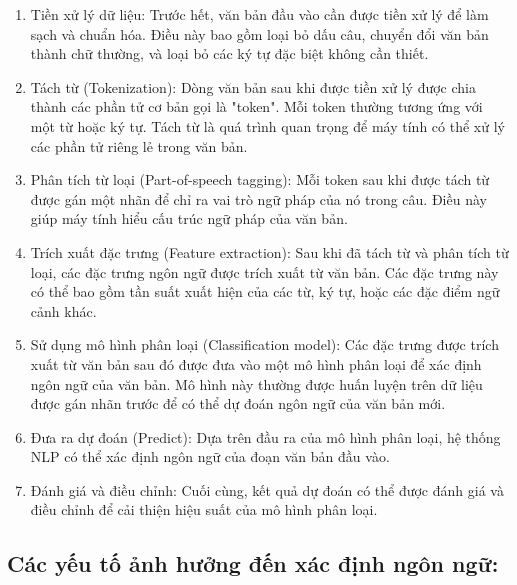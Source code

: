 \begin{enumerate}

    \item Tiền xử lý dữ liệu: Trước hết, văn bản đầu vào cần được tiền xử lý để làm sạch và chuẩn hóa. Điều này bao gồm loại bỏ dấu câu, chuyển đổi văn bản thành chữ thường, và loại bỏ các ký tự đặc biệt không cần thiết.
    \item Tách từ (Tokenization): Dòng văn bản sau khi được tiền xử lý được chia thành các phần tử cơ bản gọi là "token". Mỗi token thường tương ứng với một từ hoặc ký tự. Tách từ là quá trình quan trọng để máy tính có thể xử lý các phần tử riêng lẻ trong văn bản.
    \item Phân tích từ loại (Part-of-speech tagging): Mỗi token sau khi được tách từ được gán một nhãn để chỉ ra vai trò ngữ pháp của nó trong câu. Điều này giúp máy tính hiểu cấu trúc ngữ pháp của văn bản.
    \item Trích xuất đặc trưng (Feature extraction): Sau khi đã tách từ và phân tích từ loại, các đặc trưng ngôn ngữ được trích xuất từ văn bản. Các đặc trưng này có thể bao gồm tần suất xuất hiện của các từ, ký tự, hoặc các đặc điểm ngữ cảnh khác.
    \item Sử dụng mô hình phân loại (Classification model): Các đặc trưng được trích xuất từ văn bản sau đó được đưa vào một mô hình phân loại để xác định ngôn ngữ của văn bản. Mô hình này thường được huấn luyện trên dữ liệu được gán nhãn trước để có thể dự đoán ngôn ngữ của văn bản mới.
    \item Đưa ra dự đoán (Predict): Dựa trên đầu ra của mô hình phân loại, hệ thống NLP có thể xác định ngôn ngữ của đoạn văn bản đầu vào.
    \item Đánh giá và điều chỉnh: Cuối cùng, kết quả dự đoán có thể được đánh giá và điều chỉnh để cải thiện hiệu suất của mô hình phân loại.

\end{enumerate}

\subsection{Các yếu tố ảnh hưởng đến xác định ngôn ngữ:}

